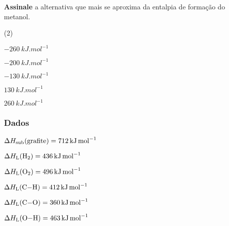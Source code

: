 \documentclass[braun, twocolumn]{braun}
\begin{document}
\begin{problem}
[2A20]\textbf{Assinale} a alternativa que mais se aproxima da entalpia de
formação do metanol.


\begin{choices}
(2)
\item \(\qty{-260}{kJ.mol^{-1}}\)

\item \(\qty{-200}{kJ.mol^{-1}}\)

\item \(\qty{-130}{kJ.mol^{-1}}\)

\item \(\qty{130}{kJ.mol^{-1}}\)

\item \(\qty{260}{kJ.mol^{-1}}\)

\end{choices}
\subsubsection*{Dados}


\begin{datalist}

\item $\Delta H_\text{sub}(\ce{grafite}) = \qty{712}{kJ.mol^{-1}}$
\item $\Delta H_\text{L}(\ce{H2}) = \qty{436}{kJ.mol^{-1}}$
\item $\Delta H_\text{L}(\ce{O2}) = \qty{496}{kJ.mol^{-1}}$
\item $\Delta H_\text{L}(\ce{C-H}) = \qty{412}{kJ.mol^{-1}}$
\item $\Delta H_\text{L}(\ce{C-O}) = \qty{360}{kJ.mol^{-1}}$
\item $\Delta H_\text{L}(\ce{O-H}) = \qty{463}{kJ.mol^{-1}}$
\end{datalist}

\end{problem}
\end{document}
